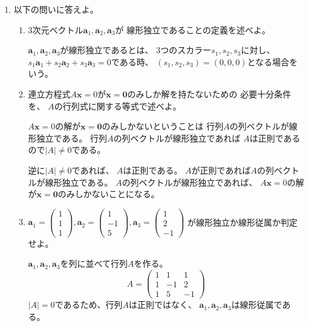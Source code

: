 \documentclass[10pt,b5paper]{ltjsarticle}
\begin{document}
\begin{enumerate}
       \hrulefill
 \item 以下の問いに答えよ。
       \begin{enumerate}
        \item 3次元ベクトル$\bm{a}_{1}, \bm{a}_{2}, \bm{a}_{3}$が
              線形独立であることの定義を述べよ。

              \dotfill

              $\bm{a}_{1}, \bm{a}_{2}, \bm{a}_{3}$が線形独立であるとは、
              3つのスカラー$s_1, s_2, s_3$に対し、
              $s_1\bm{a}_{1} + s_2\bm{a}_{2} + s_3\bm{a}_{3} = 0$である時、
              $(s_1, s_2, s_3) = (0, 0, 0)$となる場合をいう。

              \hrulefill
        \item 連立方程式$A\bm{x}=0$が$\bm{x}=\bm{0}$のみしか解を持たないための
              必要十分条件を、
              $A$の行列式に関する等式で述べよ。

              \dotfill

              $A\bm{x}=0$の解が$\bm{x}=\bm{0}$のみしかないということは
              行列$A$の列ベクトルが線形独立である。
              行列$A$の列ベクトルが線形独立であれば
              $A$は正則であるので$\lvert A \rvert \ne 0$である。

              逆に$\lvert A \rvert \ne 0$であれば、
              $A$は正則である。
              $A$が正則であれば$A$の列ベクトルが線形独立である。
              $A$の列ベクトルが線形独立であれば、
              $A\bm{x}=0$の解が$\bm{x}=\bm{0}$のみしかないことになる。

              \hrulefill
        \item $\bm{a}_{1}=\begin{pmatrix} 1\\ 1\\ 1\end{pmatrix},
              \bm{a}_{2}=\begin{pmatrix} 1\\ -1\\ 5\end{pmatrix},
              \bm{a}_{3}=\begin{pmatrix} 1\\ 2\\ -1\end{pmatrix}$
              が線形独立か線形従属か判定せよ。

              \dotfill

              $\bm{a}_{1}, \bm{a}_{2}, \bm{a}_{3}$を列に並べて行列$A$を作る。
              \begin{equation}
               A= \begin{pmatrix} 1&1&1\\ 1&-1&2\\ 1&5&-1 \end{pmatrix}
              \end{equation}
              $\lvert A \lvert = 0$であるため、行列$A$は正則ではなく、
              $\bm{a}_{1}, \bm{a}_{2}, \bm{a}_{3}$は線形従属である。


\end{enumerate}
\end{enumerate}
\end{document}
